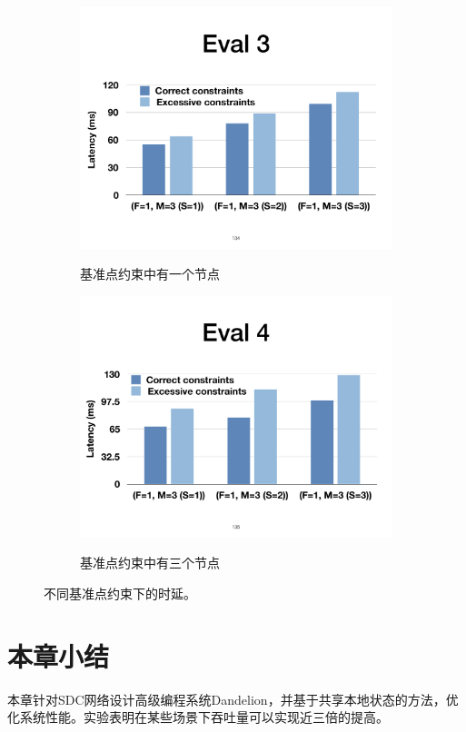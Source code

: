 \begin{figure}[!htbp]
\centering

  \begin{subfigure}[b]{\linewidth}
      \includegraphics[width=\linewidth]{figures/ss-eval3.pdf}
      \label{fig:eval3}
      \caption{基准点约束中有一个节点}
  \end{subfigure}


  \begin{subfigure}[b]{\linewidth}
      \includegraphics[width=\linewidth]{figures/ss-eval4.pdf}
      \label{fig:eval4}
      \caption{基准点约束中有三个节点}
  \end{subfigure}

\caption{不同基准点约束下的时延。}
\label{fig:eval34}
\end{figure}


\section{本章小结}

本章针对SDC网络设计高级编程系统Dandelion，并基于共享本地状态的方法，优化系统性能。实验表明在某些场景下吞吐量可以实现近三倍的提高。


